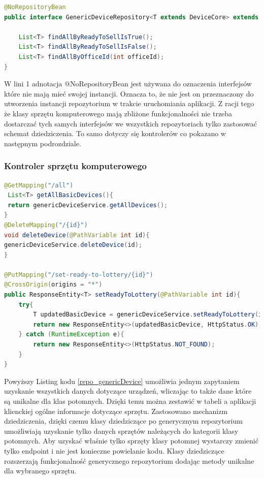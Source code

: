\begin{lstlisting}[language=Java, style=JavaStyle,  caption={Generyczne repozytorium sprzętu komputerowego}, label={repo_genericDevice}]
@NoRepositoryBean
public interface GenericDeviceRepository<T extends DeviceCore> extends JpaRepository<T, Integer> {

    List<T> findAllByReadyToSellIsTrue();
    List<T> findAllByReadyToSellIsFalse();
    List<T> findAllByOfficeId(int officeId);
}
\end{lstlisting}

W lini 1 adnotacja @NoRepositoryBean jest używana do oznaczenia interfejsów które nie mają mieć swojej instancji. Oznacza to, że nie jest on przeznaczony do utworzenia instancji repozytorium w trakcie uruchomiania aplikacji. Z racji tego że klasy sprzętu komputerowego mają zbliżone funkcjonalności nie trzeba dostarczać tych samych interfejsów we wszystkich repozytoriach tylko zastosować schemat dziedziczenia. To samo dotyczy się kontrolerów co pokazano w następnym podrozdziale.

\subsubsection{Kontroler sprzętu komputerowego}

\begin{lstlisting}[language=Java, style=JavaStyle,  caption={Wybrane metody generycznego kontrolera sprzętu komputerowego}, label={controller_genericDevice}]
@GetMapping("/all")
 List<T> getAllBasicDevices(){
 return genericDeviceService.getAllDevices();
} 
@DeleteMapping("/{id}")
void deleteDevice(@PathVariable int id){
genericDeviceService.deleteDevice(id);
}

@PutMapping("/set-ready-to-lottery/{id}")
@CrossOrigin(origins = "*")
public ResponseEntity<T> setReadyToLottery(@PathVariable int id){
    try{
        T updatedBasicDevice = genericDeviceService.setReadyToLottery(id);
        return new ResponseEntity<>(updatedBasicDevice, HttpStatus.OK);
    } catch (RuntimeException e){
        return new ResponseEntity<>(HttpStatus.NOT_FOUND);
    }
}
\end{lstlisting}

Powyższy Listing kodu \ref{repo_genericDevice} umożliwia jednym zapytaniem uzyskanie wszystkich danych dotyczące urządzeń, wliczając to także dane które są unikalne dla klas potomnych. Dzięki temu można zestawić w tabeli a aplikacji klienckiej ogólne informacje dotyczące sprzętu. Zastosowano mechanizm dziedziczenia, dzięki czemu klasy dziedziczące po generycznym repozytorium umożliwiają uzyskanie tylko danych sprzętów należących do kategorii klasy potomnych. Aby uzyskać właśnie tylko sprzęty klasy potomnej wystarczy zmienić tylko endpoint i nie jest konieczne powielanie kodu. Klasy dziedziczące rozszerzają funkcjonalność generycznego repozytorium dodając metody unikalne dla wybranego sprzętu.

